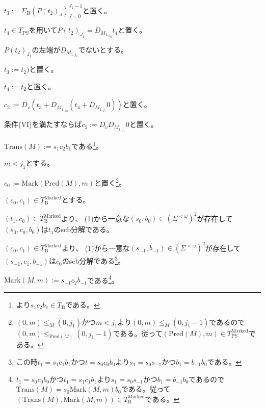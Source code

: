 \documentclass[dvipdfmx,uplatex]{jsarticle}
\theoremstyle{customnonumberbreakfortheorem}
\theoremstyle{customnonumberbreakforproof}
\begin{document}
\begin{nenumerate}
\begin{nenumerate}
\begin{nenumerate}
\begin{nenumerate}
\begin{nenumerate}
					\begin{nenumerate}
						\item \(t_3 := \Sigma_{\textrm{B}} (P(t_2)_J)_{J=0}^{J_1-1}\)と置く。
						\item \(t_4 \in T_{\textrm{PS}}\)を用いて\(P(t_2)_{J_1} = D_{M_{1,j_0}} t_4\)と置く。
					\end{nenumerate}
					\item \(P(t_2)_{J_1}\)の左端が\(D_{M_{1,j_0}}\)でないとする。
					\begin{nenumerate}
						\item \(t_3 := t_2)\)と置く。
						\item \(t_4 := t_2\)と置く。
					\end{nenumerate}
					\item \(c_2 := D_v (t_3 + D_{M_{1,j_0}}(t_4 + D_{M_{1,j_1}} 0))\)と置く。
				\end{nenumerate}
			\end{nenumerate}
			\item 条件(VI)を満たすならば\(c_2 := D_v D_{M_{1,j_1}} 0\)と置く。
			\item \(\textrm{Trans}(M) := s_1 c_2 b_1\)である\footnote{より\(s_1 c_2 b_1 \in T_{\textrm{B}}\)である。}。
			\item \(m < j_1\)とする。
			\begin{nenumerate}
				\item \(c_0 := \textrm{Mark}(\textrm{Pred}(M),m)\)と置く\footnote{\((0,m) \leq_M (0,j_1)\)かつ\(m < j_1\)より\((0,m) \leq_M (0,j_1-1)\)であるので\((0,m) \leq_{\textrm{Pred}(M)} (0,j_1-1)\)である。従って\((\textrm{Pred}(M),m) \in T_{\textrm{PS}}^{\textrm{Marked}}\)である。}。
				\item \((c_0,c_1) \in T_{\textrm{B}}^{\textrm{Marked}}\)とする。
				\begin{nenumerate}
					\item \((t_1,c_0) \in T_{\textrm{B}}^{\textrm{Marked}}\)より、 (1)から一意な\((s_0,b_0) \in (\Sigma^{< \omega})^2\)が存在して\((s_0,c_0,b_0)\)は\(t_1\)のscb分解である。
					\item \((c_0,c_1) \in T_{\textrm{B}}^\textrm{Marked}\)より、 (1)から一意な\((s_{-1},b_{-1}) \in (\Sigma^{< \omega})^2\)が存在して\((s_{-1},c_1,b_{-1})\)は\(c_0\)のscb分解である\footnote{この時\(t_1 = s_1 c_1 b_1\)かつ\(t = s_0 c_0 b_0\)より\(s_1 = s_0 s_{-1}\)かつ\(b_1 = b_{-1} b_0\)である。}。
					\item \(\textrm{Mark}(M,m) := s_{-1} c_2 b_{-1}\)である\footnote{\(t_1 = s_0 c_0 b_0\)かつ\(t_1 = s_1 c_1 b_1\)より\(s_1 = s_0 s_{-1}\)かつ\(b_1 = b_{-1} b_0\)であるので\(\textrm{Trans}(M) = s_0 \textrm{Mark}(M,m) b_0\)である。従って\((\textrm{Trans}(M),\textrm{Mark}(M,m)) \in T_{\textrm{B}}^{\textrm{Marked}}\)である。}。

\end{nenumerate}
\end{nenumerate}
\end{nenumerate}
\end{nenumerate}
\end{nenumerate}
\end{document}
